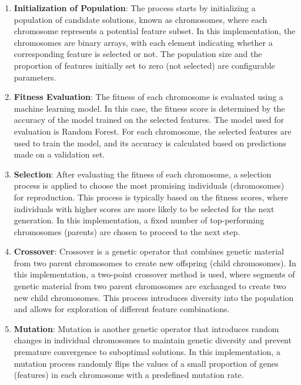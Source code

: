 \begin{enumerate}
    \item \textbf{Initialization of Population}: The process starts by initializing a population of candidate solutions, known as chromosomes, where each chromosome represents a potential feature subset. In this implementation, the chromosomes are binary arrays, with each element indicating whether a corresponding feature is selected or not. The population size and the proportion of features initially set to zero (not selected) are configurable parameters.
    
    \item \textbf{Fitness Evaluation}: The fitness of each chromosome is evaluated using a machine learning model. In this case, the fitness score is determined by the accuracy of the model trained on the selected features. The model used for evaluation is Random Forest. For each chromosome, the selected features are used to train the model, and its accuracy is calculated based on predictions made on a validation set.
    
    \item \textbf{Selection}: After evaluating the fitness of each chromosome, a selection process is applied to choose the most promising individuals (chromosomes) for reproduction. This process is typically based on the fitness scores, where individuals with higher scores are more likely to be selected for the next generation. In this implementation, a fixed number of top-performing chromosomes (parents) are chosen to proceed to the next step.
    
    \item \textbf{Crossover}: Crossover is a genetic operator that combines genetic material from two parent chromosomes to create new offspring (child chromosomes). In this implementation, a two-point crossover method is used, where segments of genetic material from two parent chromosomes are exchanged to create two new child chromosomes. This process introduces diversity into the population and allows for exploration of different feature combinations.
    
    \item \textbf{Mutation}: Mutation is another genetic operator that introduces random changes in individual chromosomes to maintain genetic diversity and prevent premature convergence to suboptimal solutions. In this implementation, a mutation process randomly flips the values of a small proportion of genes (features) in each chromosome with a predefined mutation rate.
    

\end{enumerate}
